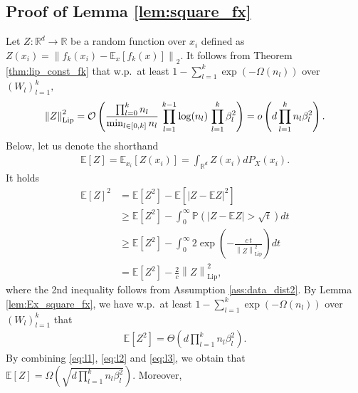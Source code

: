 \documentclass[11pt]{article}
\def\RR{\mathbb{R}}
\newcommand{\E}{\mathbb{E}}
\newenvironment{proof}{\par\noindent{\bf Proof:\ }}{\hfill$\Box$\\[2mm]}
\newcommand{\littleO}[1]{o\left(#1\right)}
\newcommand{\bigO}[1]{\mathcal{O}\left(#1\right)}
\newcommand{\bigOmg}[1]{\Omega\left(#1\right)}
\newcommand{\bigTheta}[1]{\Theta\left(#1\right)}
\newcommand{\bigexp}[1]{\exp\left(#1\right)}
\newcommand{\norm}[1]{\left\|#1\right\|}
\newcommand{\abs}[1]{\left|#1\right|}
\newcommand{\svmax}[1]{\sigma_{\rm max}\left(#1\right)}
\def\Lip{\mathrm{Lip}}
\def\PP{\mathbb{P}}
\def\min{\mathop{\rm min}\nolimits}
\def\max{\mathop{\rm max}\nolimits}
\begin{document}
\subsection{Proof of Lemma \ref{lem:square_fx}}
    Let $Z:\RR^d\to\RR$ be a random function over $x_i$ defined as $Z(x_i)=\norm{f_{k}(x_i) - \E_{x}[f_{k}(x)]}_2.$
    It follows from Theorem \ref{thm:lip_const_fk} that w.p.\ at least $1-\sum_{l=1}^{k}\bigexp{-\bigOmg{n_l}}$ over $(W_l)_{l=1}^{k},$
\begin{equation}\label{eq:l1}
    \begin{split}
	\norm{Z}_{\Lip}^2
	=\bigO{ \frac{\prod_{l=0}^k n_l}{\min_{l\in[0,k]}n_l}\, \prod_{l=1}^{k-1}\log(n_l)\, \prod_{l=1}^{k}\beta_l^2 } 
	=\littleO{d\prod_{l=1}^{k}n_l\beta_l^2}.
    \end{split}
\end{equation}  
    Below, let us denote the shorthand 
    \begin{align*}
	\E[Z]=\E_{x_i}[Z(x_i)]=\int_{\RR^d} Z(x_i) dP_X(x_i) .
    \end{align*}
    It holds
\begin{equation}\label{eq:l2}
    \begin{split}
	\E [Z]^2 
	&= \E [Z^2] - \E[\abs{Z-\E Z}^2] \\
	&\geq \E [Z^2] - \int_0^\infty \PP(\abs{Z-\E Z}>\sqrt{t}) dt \\
	&\geq \E [Z^2] - \int_0^\infty 2\bigexp{-\frac{c\,t}{\norm{Z}_{\Lip}^2}}  dt \\
	&= \E [Z^2] - \frac{2}{c}\norm{Z}_{\Lip}^2,
    \end{split}
\end{equation}  
    where the 2nd inequality follows from Assumption \ref{ass:data_dist2}. 
    By Lemma \ref{lem:Ex_square_fx}, we have w.p.\ at least $1-\sum_{l=1}^k \bigexp{-\bigOmg{n_l}}$ over $(W_l)_{l=1}^{k}$ that
\begin{equation}\label{eq:l3}
    \begin{split}
	    \E[Z^2]=\bigTheta{d\prod_{l=1}^{k}n_l\beta_l^2} .
    \end{split}
\end{equation}  
 By combining \eqref{eq:l1}, \eqref{eq:l2} and \eqref{eq:l3}, we obtain that $\E[Z]=\bigOmg{\sqrt{d\prod_{l=1}^{k}n_l\beta_l^2}}.$
    Moreover, 
\end{document}
